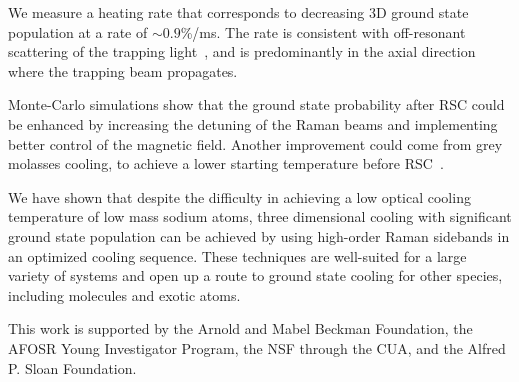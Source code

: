 \documentclass[aps,prl,twocolumn,groupedaddress]{revtex4-1}
\begin{document}
We measure a heating rate that corresponds to decreasing 3D ground state population
at a rate of $\sim0.9$\%/ms.
The rate is consistent with off-resonant scattering of the trapping light~\cite{Grimm2000},
and is predominantly in the axial direction where the trapping beam propagates.

Monte-Carlo simulations show that the ground state probability after RSC
could be enhanced by increasing the detuning of the Raman beams and implementing
better control of the magnetic field. Another improvement could come from
grey molasses cooling, to achieve a lower starting temperature before RSC~\cite{Colzi2016}.

We have shown that despite the difficulty in achieving a low optical cooling temperature
of low mass sodium atoms, three dimensional cooling
with significant ground state population can be achieved by using high-order Raman sidebands
in an optimized cooling sequence.
These techniques are well-suited for a large variety of systems
and open up a route to ground state cooling for other species,
including molecules and exotic atoms.

This work is supported by the Arnold and Mabel Beckman Foundation, the AFOSR Young Investigator Program, the NSF through the CUA,
and the Alfred P. Sloan Foundation.


\end{document}
